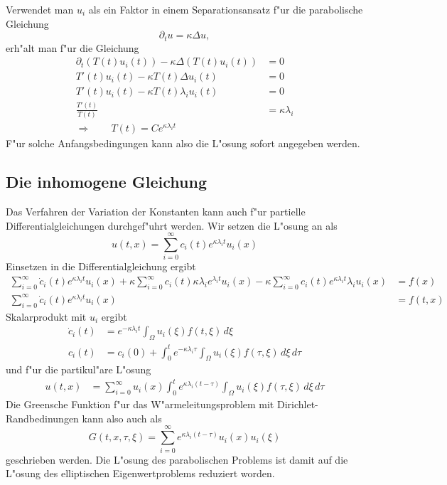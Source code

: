 Verwendet man $u_i$ als ein Faktor in einem Separationsansatz f"ur
die parabolische Gleichung
\[
\partial_tu=\kappa\Delta u,
\]
erh"alt man f"ur die Gleichung
\begin{align*}
\partial_t (T(t)u_i(t))-\kappa\Delta(T(t)u_i(t))&=0
\\
T'(t)u_i(t)-\kappa T(t)\Delta u_i(t)&=0
\\
T'(t)u_i(t)-\kappa T(t)\lambda_i u_i(t)&=0
\\
\frac{T'(t)}{T(t)}&=\kappa\lambda_i
\\
\Rightarrow\qquad T(t)=Ce^{\kappa\lambda_it}
\end{align*}
F"ur solche Anfangsbedingungen kann also die L"osung sofort angegeben
werden.
\subsection{Die inhomogene Gleichung}
Das Verfahren der Variation der Konstanten kann auch f"ur partielle
Differentialgleichungen durchgef"uhrt werden. Wir setzen die L"osung
an als
\[
u(t,x)=\sum_{i=0}^\infty c_i(t) e^{\kappa\lambda_i t}u_i(x)
\]
Einsetzen in die Differentialgleichung ergibt
\begin{align*}
\sum_{i=0}^\infty \dot c_i(t)e^{\kappa\lambda_it}u_i(x)
+\kappa\sum_{i=0}^\infty c_i(t)\kappa\lambda_i e^{\lambda_it}u_i(x)
-\kappa\sum_{i=0}^\infty c_i(t)e^{\kappa\lambda_it}\lambda_iu_i(x)
&=f(x)
\\
\sum_{i=0}^\infty \dot c_i(t)e^{\kappa\lambda_it}u_i(x)
&=f(t,x)
\end{align*}
Skalarprodukt mit $u_i$ ergibt
\begin{align*}
\dot c_i(t)&= e^{-\kappa\lambda_it}\int_{\Omega}u_i(\xi)f(t,\xi)\,d\xi
\\
c_i(t)&=c_i(0)+\int_0^te^{-\kappa\lambda_i\tau}\int_{\Omega}u_i(\xi)f(\tau,\xi)\,d\xi\,d\tau
\end{align*}
und f"ur die partikul"are L"osung
\begin{align*}
u(t,x)&=
\sum_{i=0}^\infty
u_i(x)
\int_0^t
e^{\kappa\lambda_i(t-\tau)}\int_{\Omega}u_i(\xi)f(\tau,\xi)\,d\xi\,d\tau
\end{align*}
Die Greensche Funktion f"ur das W"armeleitungsproblem mit
Dirichlet-Randbedinungen kann also auch als
\[
G(t,x,\tau,\xi)
=
\sum_{i=0}^\infty
e^{\kappa\lambda_i (t-\tau)}
u_i(x)
u_i(\xi)
\]
geschrieben werden. Die L"osung des parabolischen Problems ist damit
auf die L"osung des elliptischen Eigenwertproblems reduziert worden.


